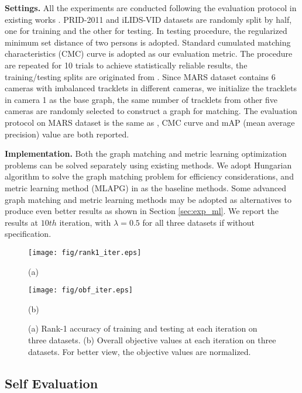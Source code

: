 \documentclass[10pt,twocolumn,letterpaper]{article}
\begin{document}
\textbf{Settings.} All the experiments are conducted following the evaluation protocol in existing works \cite{ijcai16video,cvpr16top}. PRID-2011 and iLIDS-VID datasets are randomly split by half, one for training and the other for testing. In testing procedure, the regularized minimum set distance \cite{yang2013face} of two persons is adopted. Standard cumulated matching characteristics (CMC) curve is adopted as our evaluation metric. The procedure are repeated for 10 trials to achieve statistically reliable results, the training/testing splits are originated from \cite{cvpr16top}. Since MARS dataset contains 6 cameras with imbalanced tracklets in different cameras, we initialize the tracklets in camera 1 as the base graph, the same number of tracklets from other five cameras are randomly selected to construct a graph for matching. The evaluation protocol on MARS dataset is the same as \cite{eccv16mars}, CMC curve and mAP (mean average precision) value are both reported.

\textbf{Implementation.} Both the graph matching and metric learning optimization problems can be solved separately using existing methods. We adopt Hungarian algorithm to solve the graph matching problem for efficiency considerations, and metric learning method (MLAPG) in \cite{iccv15liao} as the baseline methods. Some advanced graph matching and metric learning methods may be adopted as alternatives to produce even better results as shown in Section \ref{sec:exp_ml}. We report the results at $10th$ iteration, with $\lambda =0.5$ for all three datasets if without specification.
\begin{figure}[t]
  \centering
  \begin{minipage}[t]{0.25\textwidth}
        \centering
        \texttt{[image: fig/rank1\_iter.eps]}
        \centerline{\small{(a) } }\medskip
    \end{minipage}\begin{minipage}[t]{0.25\textwidth}
        \centering
        \texttt{[image: fig/obf\_iter.eps]}
        \centerline{\small{(b) }}\medskip
    \end{minipage}\caption{\small{(a) Rank-1 accuracy of training and testing at each iteration on three datasets. (b) Overall objective values at each iteration on three datasets. For better view, the objective values are normalized.}}\label{fig:iter}
\vspace{-0.1cm}
\end{figure}
\subsection{Self Evaluation}\label{sec:self}
\end{document}
